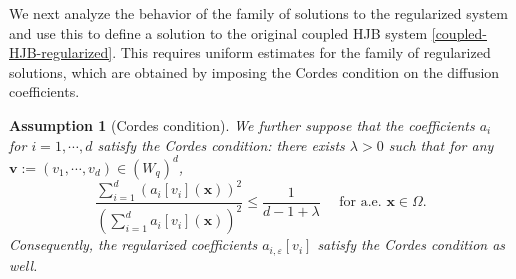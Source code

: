 \documentclass[final,onefignum,onetabnum]{mousaviart}
\newtheorem{assumption}{Assumption}
\begin{document}
	We next analyze the behavior of the family of solutions to the regularized system and use this to define a solution to the original coupled HJB system \eqref{coupled-HJB-regularized}. This requires uniform estimates for the family of regularized solutions, which are obtained by imposing the Cordes condition on the diffusion coefficients.
	\\
	\begin{assumption}[Cordes condition]
	We further suppose that the coefficients $a_{i}$ for $i=1, \cdots, d$ satisfy the Cordes condition: there exists $\lambda>0$ such that for any $\boldsymbol{v}:=(v_1, \cdots, v_d) \in ( W_q )^d $, 
	\begin{equation}
		\label{ineq:Cordes-condition}
		\frac{\sum_{i=1}^{d}{\left( a_i\left[ v_i\right] (\boldsymbol{x})\right)^2} }{\left( \sum_{i=1}^{d}{a_i\left[ v_i\right] (\boldsymbol{x})} \right)^2 }
		\leq
		\frac{1}{d - 1 + \lambda}
		\quad
		\text{ for a.e. }
		\boldsymbol{x} \in \Omega.
	\end{equation}
	Consequently, the regularized coefficients $a_{i,\varepsilon}\left[ v_i\right]$ satisfy the Cordes condition as well.
	\end{assumption}
	
\end{document}
